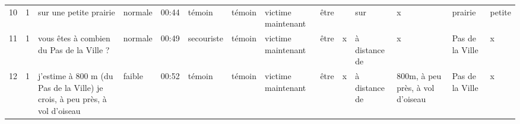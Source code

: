 \begin{landscape}
\begin{longtable}{>{\small}r>{\small}r>{\tiny}p{2.5cm}>{\tiny}l>{\tiny}l>{\tiny}l>{\tiny}l>{\tiny}p{1.5cm}>{\tiny}l>{\tiny}p{1.5cm}>{\tiny}p{1.5cm}>{\tiny}p{1.5cm}>{\tiny}p{1.5cm}>{\tiny}p{1.5cm}}
    10&1&sur une petite prairie&normale&00:44&témoin&témoin&victime maintenant&être&&sur&x&prairie&petite\\
    11&1&vous êtes à combien du Pas de la Ville ?&normale&00:49&secouriste&témoin&victime maintenant&être&x&à distance de&x&Pas de la Ville&x\\
    12&1&j'estime à 800 m (du Pas de la Ville) je crois, à peu près, à vol d'oiseau&faible&00:52&témoin&témoin&victime maintenant&être&x&à distance de&800m, à peu près, à vol d'oiseau&Pas de la Ville&x\\  
    \bottomrule
  \end{longtable}
  \label{tab:ds}
\end{landscape}